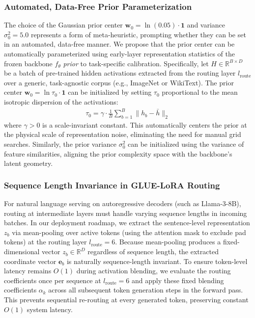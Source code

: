 \subsubsection{Automated, Data-Free Prior Parameterization}
The choice of the Gaussian prior center $\mathbf{w}_0 = \ln(0.05) \cdot \mathbf{1}$ and variance $\sigma_0^2 = 5.0$ represents a form of meta-heuristic, prompting whether they can be set in an automated, data-free manner. We propose that the prior center can be automatically parameterized using early-layer representation statistics of the frozen backbone $f_\theta$ \emph{prior} to task-specific calibration. 
Specifically, let $H \in \mathbb{R}^{B \times D}$ be a batch of pre-trained hidden activations extracted from the routing layer $l_{\text{route}}$ over a generic, task-agnostic corpus (e.g., ImageNet or WikiText). The prior center $\mathbf{w}_0 = \ln \tau_0 \cdot \mathbf{1}$ can be initialized by setting $\tau_0$ proportional to the mean isotropic dispersion of the activations:
\begin{align}
    \tau_0 = \gamma \cdot \frac{1}{B} \sum_{b=1}^B \|h_b - \bar{h}\|_2
\end{align}
where $\gamma > 0$ is a scale-invariant constant. This automatically centers the prior at the physical scale of representation noise, eliminating the need for manual grid searches. Similarly, the prior variance $\sigma_0^2$ can be initialized using the variance of feature similarities, aligning the prior complexity space with the backbone's latent geometry.

\subsubsection{Sequence Length Invariance in GLUE-LoRA Routing}
For natural language serving on autoregressive decoders (such as Llama-3-8B), routing at intermediate layers must handle varying sequence lengths in incoming batches. In our deployment roadmap, we extract the sentence-level representation $z_b$ via mean-pooling over active tokens (using the attention mask to exclude pad tokens) at the routing layer $l_{\text{route}} = 6$. Because mean-pooling produces a fixed-dimensional vector $z_b \in \mathbb{R}^D$ regardless of sequence length, the extracted coordinate vector $\mathbf{e}_b$ is naturally sequence-length invariant. To ensure token-level latency remains $O(1)$ during activation blending, we evaluate the routing coefficients once per sequence at $l_{\text{route}} = 6$ and apply these fixed blending coefficients $\alpha_k$ across all subsequent token generation steps in the forward pass. This prevents sequential re-routing at every generated token, preserving constant $O(1)$ system latency.

